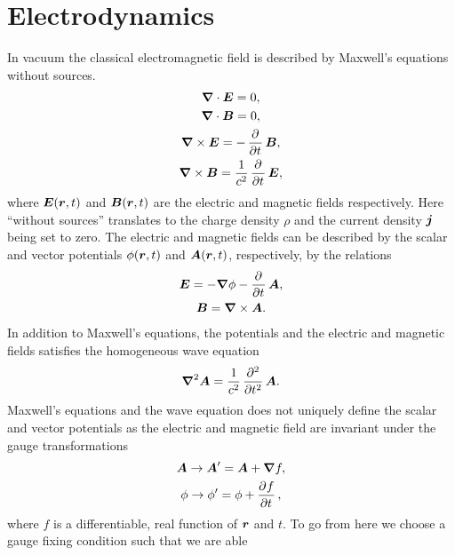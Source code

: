     \section{Electrodynamics}
        In vacuum the classical electromagnetic field is described by Maxwell's
        equations without sources.
        \begin{gather}
            \vfg{\nabla}\cdot\vfg{E} = 0, \\
            \vfg{\nabla}\cdot\vfg{B} = 0, \\
            \vfg{\nabla}\times\vfg{E} = -\dpd{}{t}\vfg{B}, \\
            \vfg{\nabla}\times\vfg{B} = \frac{1}{c^2}\dpd{}{t}\vfg{E},
        \end{gather}
        where $\boldsymbol{E}(\boldsymbol{r}, t)$ and $\boldsymbol{B}(\boldsymbol{r}, t)$ are the
        electric and magnetic fields respectively.
        Here ``without sources'' translates to the charge density $\rho$ and the
        current density $\boldsymbol{j}$ being set to zero.
        The electric and magnetic fields can be described by the scalar and
        vector potentials $\phi(\boldsymbol{r}, t)$ and $\boldsymbol{A}(\boldsymbol{r}, t)$,
        respectively, by the relations
        \begin{gather}
            \vfg{E} = -\vfg{\nabla}\phi - \dpd{}{t}\vfg{A}, \\
            \vfg{B} = \vfg{\nabla}\times\vfg{A}.
        \end{gather}
        In addition to Maxwell's equations, the potentials and the electric and
        magnetic fields satisfies the homogeneous wave equation
        \cite{joachain2012atoms}
        \begin{align}
            \vfg{\nabla}^2\vfg{A} = \frac{1}{c^2}\dpd[2]{}{t}\vfg{A}.
            \label{eq:wave-equation}
        \end{align}
        Maxwell's equations and the wave equation does not uniquely define the
        scalar and vector potentials as the electric and magnetic field are
        invariant under the gauge transformations
        \begin{gather}
            \vfg{A} \to \vfg{A}' = \vfg{A} + \vfg{\nabla} f, \\
            \phi \to \phi' = \phi + \dpd{f}{t},
        \end{gather}
        where $f$ is a differentiable, real function of $\boldsymbol{r}$ and $t$.
        To go from here we choose a gauge fixing condition such that we are able
